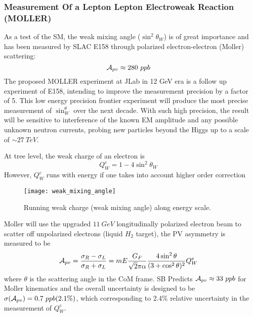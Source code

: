 \subsubsection{Measurement Of a Lepton Lepton Electroweak Reaction (MOLLER)}
As a test of the SM, the weak mixing angle ($\sin^2\theta_W$) is of great importance 
and has been measured by SLAC E158 through polarized electron-electron (Moller) scattering:
\begin{equation}
    \mathcal{A}_{pv} \approx 280 \ ppb
\end{equation}
The proposed MOLLER experiment at JLab in 12 GeV era is a follow up experiment 
of E158, intending to improve the measurement precision by a factor of 5.
This low energy precision frontier experiment will produce the most precise 
measurement of $\sin^\theta_W$ over the next decade. With such high precision,
the result will be sensitive to interference of the known EM amplitude and any
possible unknown neutron currents, probing new particles beyond the Higgs up
to a scale of $\sim 27\ TeV$.

At tree level, the weak charge of an electron is
\begin{equation}
    Q_W^e = 1 - 4\sin^2\theta_W
\end{equation}
However, $Q_W^e$ runs with energy if one takes into account higher order correction
\begin{figure}
    \centering
    \texttt{[image: weak\_mixing\_angle]}
    \caption{Running weak charge (weak mixing angle) along energy scale.}
\end{figure}
Moller will use the upgraded $11\ GeV$ longitudinally polarized electron beam 
to scatter off unpolarized electrons (liquid $H_2$ target), the PV asymmetry
is measured to be
\begin{equation}
    \mathcal{A}_{pv} = \frac{\sigma_R - \sigma_L}{\sigma_R + \sigma_L}
    = mE\frac{G_F}{\sqrt{2}\pi\alpha}\frac{4\sin^2\theta}{(3+\cos^2\theta)^2} Q_W^e
\end{equation}
where $\theta$ is the scattering angle in the CoM frame. SB Predicts $\mathcal{A}_{pv} \approx 33 \ ppb$
for Moller kinematics and the overall uncertainty is designed to be $\sigma(\mathcal{A}_{pv}) = 0.7 \ ppb (2.1\%)$,
which corresponding to $2.4\%$ relative uncertainty in the measurement of $Q_W^e$.


